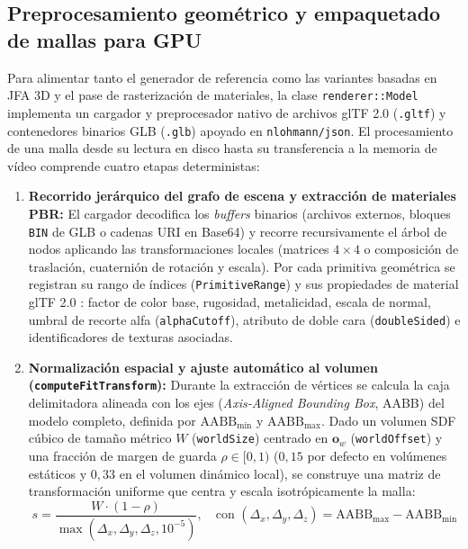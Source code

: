 \subsection{Preprocesamiento geométrico y empaquetado de mallas para GPU}

Para alimentar tanto el generador de referencia como las variantes basadas en JFA 3D y el pase de rasterización de materiales, la clase \texttt{renderer::Model} implementa un cargador y preprocesador nativo de archivos glTF 2.0 (\texttt{.gltf}) y contenedores binarios GLB (\texttt{.glb}) apoyado en \texttt{nlohmann/json}. El procesamiento de una malla desde su lectura en disco hasta su transferencia a la memoria de vídeo comprende cuatro etapas deterministas:

\begin{enumerate}
  \item \textbf{Recorrido jerárquico del grafo de escena y extracción de materiales PBR:} El cargador decodifica los \textit{buffers} binarios (archivos externos, bloques \texttt{BIN} de GLB o cadenas URI en Base64) y recorre recursivamente el árbol de nodos aplicando las transformaciones locales (matrices $4\times 4$ o composición de traslación, cuaternión de rotación y escala). Por cada primitiva geométrica se registran su rango de índices (\texttt{PrimitiveRange}) y sus propiedades de material glTF 2.0 \cite{khronos_gltf2}: factor de color base, rugosidad, metalicidad, escala de normal, umbral de recorte alfa (\texttt{alphaCutoff}), atributo de doble cara (\texttt{doubleSided}) e identificadores de texturas asociadas.
  \item \textbf{Normalización espacial y ajuste automático al volumen (\texttt{computeFitTransform}):} Durante la extracción de vértices se calcula la caja delimitadora alineada con los ejes (\textit{Axis-Aligned Bounding Box}, AABB) del modelo completo, definida por $\text{AABB}_{\min}$ y $\text{AABB}_{\max}$. Dado un volumen SDF cúbico de tamaño métrico $W$ (\texttt{worldSize}) centrado en $\mathbf{o}_w$ (\texttt{worldOffset}) y una fracción de margen de guarda $\rho \in [0, 1)$ ($0,15$ por defecto en volúmenes estáticos y $0,33$ en el volumen dinámico local), se construye una matriz de transformación uniforme que centra y escala isotrópicamente la malla:
  \begin{equation}
    s = \frac{W \cdot (1 - \rho)}{\max\left(\Delta_x, \Delta_y, \Delta_z, 10^{-5}\right)}, \quad \text{con } (\Delta_x, \Delta_y, \Delta_z) = \text{AABB}_{\max} - \text{AABB}_{\min}
  \end{equation}

\end{enumerate}
